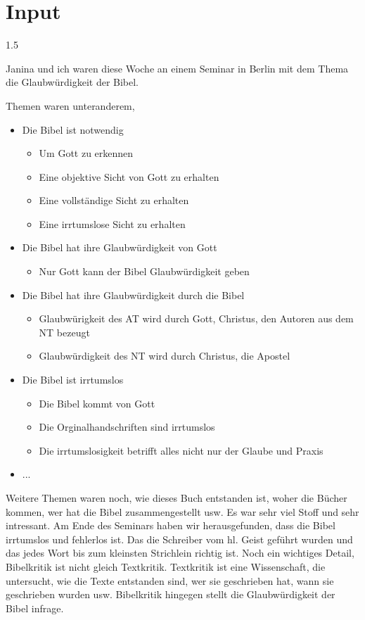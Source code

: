 \documentclass[fontsize=14pt]{mybib}
\begin{document}
\section{ Input }
\begin{spacing}{1.5}
    \begin{otsblock}[Einführung]
    Janina und ich waren diese Woche an einem Seminar in Berlin mit dem Thema die Glaubwürdigkeit der Bibel.
    
    Themen waren unteranderem, 
    \begin{itemize}
        \item Die Bibel ist notwendig
        \begin{itemize}
            \item Um Gott zu erkennen
            \item Eine objektive Sicht von Gott zu erhalten
            \item Eine vollständige Sicht zu erhalten
            \item Eine irrtumslose Sicht zu erhalten
        \end{itemize}
        \item Die Bibel hat ihre Glaubwürdigkeit von Gott
        \begin{itemize}
            \item Nur Gott kann der Bibel Glaubwürdigkeit geben 
        \end{itemize}
        \item Die Bibel hat ihre Glaubwürdigkeit durch die Bibel
        \begin{itemize}
            \item Glaubwürigkeit des AT wird durch Gott, Christus, den Autoren aus dem NT bezeugt
            \item Glaubwürdigkeit des NT wird durch Christus, die Apostel 
        \end{itemize}
        \item Die Bibel ist irrtumslos 
        \begin{itemize}
            \item Die Bibel kommt von Gott
            \item Die Orginalhandschriften sind irrtumslos
            \item Die irrtumslosigkeit betrifft alles nicht nur der Glaube und Praxis
        \end{itemize}
        \item ...
    \end{itemize}
    Weitere Themen waren noch, wie dieses Buch entstanden ist, woher die Bücher kommen, wer hat die Bibel zusammengestellt usw. Es war sehr viel Stoff und sehr intressant.
    Am Ende des Seminars haben wir herausgefunden, dass die Bibel irrtumslos und fehlerlos ist. Das die Schreiber vom hl. Geist geführt wurden und das jedes Wort bis zum kleinsten Strichlein richtig ist. 
    Noch ein wichtiges Detail, Bibelkritik ist nicht gleich Textkritik. Textkritik ist eine Wissenschaft, die untersucht, wie die Texte entstanden sind, wer sie geschrieben hat, wann sie geschrieben wurden usw. Bibelkritik hingegen stellt die Glaubwürdigkeit der Bibel infrage.


\end{otsblock}
\end{spacing}
\end{document}
